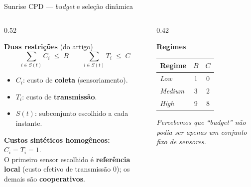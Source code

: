 \documentclass[aspectratio=169, 11pt]{beamer}
\begin{document}
\begin{frame}{Sunrise CPD --- \textit{budget} e seleção dinâmica}

\begin{columns}[T]
\begin{column}{0.52\textwidth}

\textbf{Duas restrições} (do artigo)
\[
  \sum_{i \in S(t)} C_i \;\leq\; B
  \qquad
  \sum_{i \in S(t)} T_i \;\leq\; C
\]

\begin{itemize}
  \item $C_i$: custo de \textbf{coleta} (sensoriamento).
  \item $T_i$: custo de \textbf{transmissão}.
  \item $S(t)$: subconjunto escolhido a cada instante.
\end{itemize}

\vspace{0.4em}
\textbf{Custos sintéticos homogêneos:} $C_i = T_i = 1$.\\
O primeiro sensor escolhido é \textbf{referência local}
(custo efetivo de transmissão $0$); os demais são
\textbf{cooperativos}.

\end{column}
\begin{column}{0.42\textwidth}

\textbf{Regimes}

\vspace{0.3em}
\small
\begin{tabular}{@{}lcc@{}}
  \toprule
  \textbf{Regime} & $B$ & $C$ \\
  \midrule
  \textit{Low}    & 1 & 0 \\
  \textit{Medium} & 3 & 2 \\
  \textit{High}   & 9 & 8 \\
  \bottomrule
\end{tabular}

\vspace{0.7em}
\itshape
Percebemos que ``\textit{budget}'' não podia ser apenas um conjunto fixo de sensores.

\end{column}
\end{columns}

\end{frame}
\end{document}

